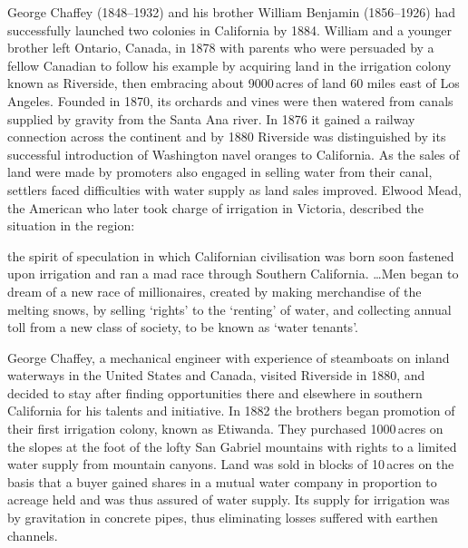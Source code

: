 George Chaffey (1848--1932) and his brother William Benjamin
(1856--1926) had successfully laun\-ch\-ed two colonies in California
by 1884.  William and a younger brother left Ontario, Canada, in 1878
with parents who were persuaded by a fellow Canadian to follow his
example by acquiring land in the irrigation colony known as Riverside,
then embracing about 9000\,acres of land 60 miles east of Los
Angeles.  Founded in 1870, its orchards and vines
were then watered from canals supplied by gravity from the Santa Ana
river.  In 1876 it gained a railway connection across the continent
and by 1880 Riverside was distinguished by its successful introduction
of Washington navel oranges to California.
As the sales of land were made by promoters also engaged in selling
water from their canal, settlers faced difficulties with water supply
as land sales improved.  Elwood Mead,  the American
who later took charge of irrigation in Victoria, described the
situation in the region:
\begin{Quote}
	the spirit of speculation in which Californian civilisation
	was born soon fastened upon irrigation and ran a mad race
	through Southern California. \ldots Men began to dream of a
	new race of millionaires, created by making merchandise of the
	melting snows, by selling `rights' to the `renting' of water,
	and collecting annual toll from a new class of society, to be
	known as `water tenants'.
\end{Quote}

George Chaffey,  a mechanical engineer with
experience of steamboats on inland waterways in the United States and
Canada, visited Riverside in 1880, and decided to stay after finding
opportunities there and elsewhere in southern California for his
talents and initiative.  In 1882 the brothers began promotion of their
first irrigation colony, known as
Etiwanda.  They purchased
1000\,acres on the slopes at the foot of the lofty San Gabriel
mountains with rights to a limited water supply from mountain canyons.
Land was sold in blocks of 10\,acres on the basis that a buyer gained
shares in a mutual water company in proportion to acreage held and was
thus assured of water supply.  Its supply for irrigation was by
gravitation in concrete pipes, thus eliminating losses suffered with
earthen channels.

